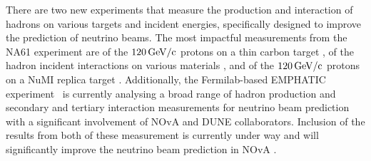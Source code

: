 There are two new experiments that measure the production and interaction of hadrons on various targets and incident energies, specifically designed to improve the prediction of neutrino beams.
The most impactful measurements from the NA61 experiment are of the $\unit[120]{GeV/c}$ protons on a thin carbon target \cite{2019_NA61_ProdAndInelXSec_protonOnDiffTargets60And120GeV._results.pdf, NA61_hadprodFrompC_120GeV_2023.pdf, NA61_ResonanceProdFrompC_120GeV_2023.pdf}, of the hadron incident interactions on various materials \cite{2019_had_prod_at_Pi_on_C_and_Be.pdf}, and of the $\unit[120]{GeV/c}$ protons on a \gls{NuMI} replica target \cite{ThickTargetLimit.pdf}. Additionally, the \gls{Fermilab}-based EMPHATIC experiment~\cite{EMPHATICProposal2019.pdf} is currently analysing a broad range of hadron production and secondary and tertiary interaction measurements for neutrino beam prediction with a significant involvement of \gls{NOvA} and \gls{DUNE} collaborators. Inclusion of the results from both of these measurement is currently under way and will significantly improve the neutrino beam prediction in \gls{NOvA} \cite{ThickTargetLimit.pdf}.


